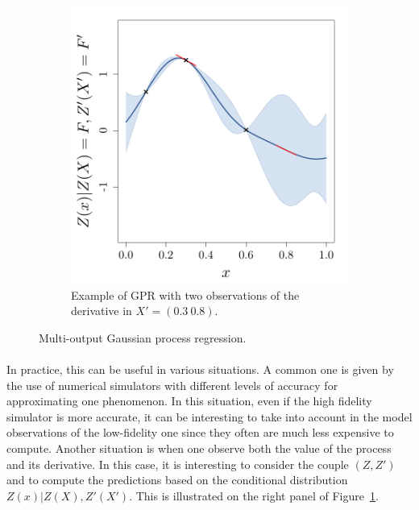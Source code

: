 \documentclass[twoside,openright]{report}
\begin{document}
\begin{figure}
\begin{subfigure}[b]{0.44\textwidth}
                \includegraphics[width=\textwidth]{figures/ch2_derGPR}
                \caption{Example of GPR with two observations of the derivative in $X'=(0.3\ 0.8)$.}
        \end{subfigure}
        \caption{Multi-output Gaussian process regression.}
        \label{fig:multiGPR}
\end{figure}

\paragraph{}
In practice, this can be useful in various situations. A common one is given by the use of numerical simulators with different levels of accuracy for approximating one phenomenon. In this situation, even if the high fidelity simulator is more accurate, it can be interesting to take into account in the model observations of the low-fidelity one since they often are much less expensive to compute. Another situation is when one observe both the value of the process and its derivative. In this case, it is interesting to consider the couple $(Z,Z')$ and to compute the predictions based on the conditional distribution $Z(x)|Z(X),Z'(X')$. This is illustrated on the right panel of Figure~\ref{fig:multiGPR}.

\end{document}
